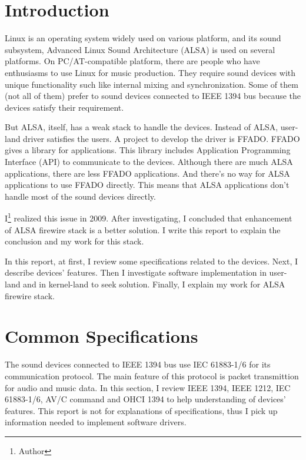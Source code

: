 \documentclass[onecolumn]{article}
\begin{document}
\newpage


\section{Introduction}

Linux is an operating system widely used on various platform, and its sound subsystem, Advanced Linux Sound Architecture (ALSA) is used on several platforms. On PC/AT-compatible platform, there are people who have enthusiasms to use Linux for music production. They require sound devices with unique functionality such like internal mixing and synchronization. Some of them (not all of them) prefer to sound devices connected to IEEE 1394 bus because the devices satisfy their requirement.

But ALSA, itself, has a weak stack to handle the devices. Instead of ALSA, user-land driver satisfies the users. A project to develop the driver is FFADO. FFADO gives a library for applications. This library includes Application Programming Interface (API) to communicate to the devices. Although there are much ALSA applications, there are less FFADO applications. And there's no way for ALSA applications to use FFADO directly. This means that ALSA applications don't handle most of the sound devices directly.

I\footnote{Author} realized this issue in 2009. After investigating, I concluded that enhancement of ALSA firewire stack is a better solution. I write this report to explain the conclusion and my work for this stack.

In this report, at first, I review some specifications related to the devices. Next, I describe devices' features. Then I investigate software implementation in user-land and in kernel-land to seek solution. Finally, I explain my work for ALSA firewire stack.


\section{Common Specifications}

The sound devices connected to IEEE 1394 bus use IEC 61883-1/6 for its communication protocol. The main feature of this protocol is packet transmittion for audio and music data. In this section, I review IEEE 1394, IEEE 1212, IEC 61883-1/6, AV/C command and OHCI 1394 to help understanding of devices' features. This report is not for explanations of specifications, thus I pick up information needed to implement software drivers.
\end{document}
